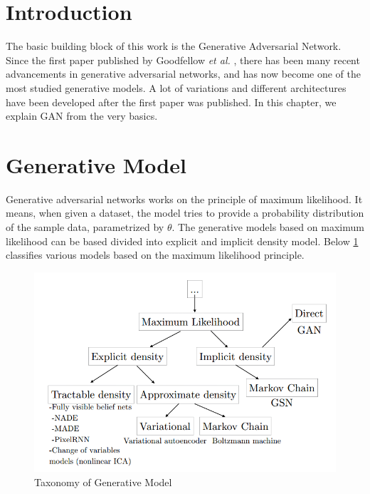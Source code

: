 
\doublespacing
{}
\label{chap:GAN}
\section{Introduction}

The basic building block of this work is the Generative Adversarial Network. Since the first paper published by Goodfellow \textit{et al.} \cite{Original-GAN}, there has been many recent advancements in generative adversarial networks, and has now become one of the most studied generative models. A lot of variations and different architectures have been developed after the first paper was published. In this chapter, we explain GAN from the very basics.

\section{Generative Model}
Generative adversarial networks works on the principle of maximum likelihood.
It means, when given a dataset, the model tries to provide a probability distribution of the sample data, parametrized by $\theta$. The generative models based on maximum likelihood can be based divided into explicit and implicit density model. Below \cref{fig: jordan} classifies various models based on the maximum likelihood principle.
%
\begin{figure}[ht]
    
    \includegraphics[scale=.6, angle=0]{Files/taxanomy.png}
    \caption[The panther]{Taxonomy of Generative Model\cite{GanTut}}
    \label{fig: jordan}
\end{figure}

